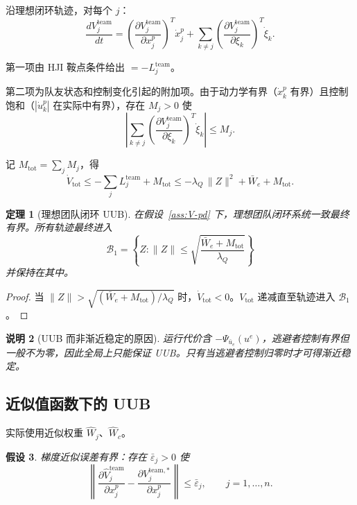 \documentclass[12pt,a4paper]{ctexart}
\newtheorem{theorem}{定理}[section]
\newtheorem{assumption}[theorem]{假设}
\newtheorem{remark}[theorem]{说明}
\begin{document}
沿理想闭环轨迹，对每个 $j$：
\[
\frac{d V_j^{\mathrm{team}}}{dt}
= \left(\frac{\partial V_j^{\mathrm{team}}}{\partial x_j^p}\right)^{\!T} \dot{x}_j^p
+ \sum_{k \neq j} \left(\frac{\partial V_j^{\mathrm{team}}}{\partial \xi_k}\right)^{\!T} \dot{\xi}_k.
\]

第一项由 HJI 鞍点条件给出 $= -L_j^{\mathrm{team}}$。

第二项为队友状态和控制变化引起的附加项。由于动力学有界（$\dot{x}_k^p$ 有界）且控制饱和（$|\dot{u}_k^p|$ 在实际中有界），存在 $M_j > 0$ 使
\begin{equation}
\left|\sum_{k \neq j} \left(\frac{\partial V_j^{\mathrm{team}}}{\partial \xi_k}\right)^{\!T} \dot{\xi}_k\right| \le M_j.
\end{equation}

记 $M_{\mathrm{tot}} = \sum_j M_j$，得
\begin{equation}\label{eq:V-dot-bound}
\dot{V}_{\mathrm{tot}} \le -\sum_{j} L_j^{\mathrm{team}} + M_{\mathrm{tot}} \le -\lambda_Q\,\|Z\|^2 + \bar{W}_e + M_{\mathrm{tot}}.
\end{equation}

\begin{theorem}[理想团队闭环 UUB]\label{thm:ideal-uub}
在假设~\ref{ass:V-pd} 下，理想团队闭环系统一致最终有界。所有轨迹最终进入
\[
\mathcal{B}_1 = \left\{Z : \|Z\| \le \sqrt{\frac{\bar{W}_e + M_{\mathrm{tot}}}{\lambda_Q}}\right\}
\]
并保持在其中。
\end{theorem}

\begin{proof}
当 $\|Z\| > \sqrt{(\bar{W}_e + M_{\mathrm{tot}})/\lambda_Q}$ 时，$\dot{V}_{\mathrm{tot}} < 0$。$V_{\mathrm{tot}}$ 递减直至轨迹进入 $\mathcal{B}_1$。
\end{proof}

\begin{remark}[UUB 而非渐近稳定的原因]
运行代价含 $-\Psi_{\bar{u}_e}(u^e)$，逃避者控制有界但一般不为零，因此全局上只能保证 UUB。只有当逃避者控制归零时才可得渐近稳定。
\end{remark}

\subsection{近似值函数下的 UUB}

实际使用近似权重 $\hat{W}_j$、$\hat{W}_c$。

\begin{assumption}\label{ass:grad-error}
梯度近似误差有界：存在 $\bar{\varepsilon}_j > 0$ 使
\[
\left\|\frac{\partial \hat{V}_j^{\mathrm{team}}}{\partial x_j^p} - \frac{\partial V_j^{\mathrm{team},*}}{\partial x_j^p}\right\| \le \bar{\varepsilon}_j, \qquad j = 1, \dots, n.
\]
\end{assumption}
\end{document}
